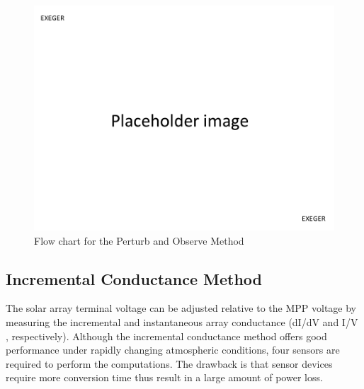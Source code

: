   \begin{figure}[H]
    \begin{center}
    \includegraphics[width=\textwidth]{images/pacehold}
    \caption{ Flow chart for the Perturb and Observe Method }
    \label{fig:PnOflow}
    \end{center}
    \end{figure}
  
  \subsection{Incremental Conductance Method }
  The  solar array terminal  voltage  can  be  adjusted relative to the MPP voltage by measuring the incremental and instantaneous  array  conductance (dI/dV and I/V ,   respectively).  Although  the  incremental  conductance method offers good performance under rapidly changing atmospheric  conditions,  four  sensors  are  required to   perform the  computations. The  drawback is that sensor devices require  more  conversion  time  thus  result in a large amount of power loss.   \\
  
